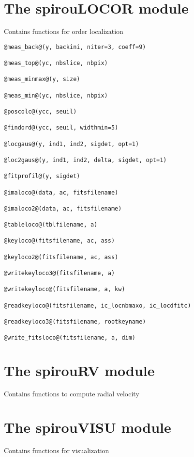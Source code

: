 \clearpage
\newpage
\section{The spirouLOCOR module}

Contains functions for order localization

\begin{lstlisting}[style=pythonstyle]
@meas_back@(y, backini, niter=3, coeff=9)

@meas_top@(yc, nbslice, nbpix)

@meas_minmax@(y, size)

@meas_min@(yc, nbslice, nbpix)

@poscolc@(ycc, seuil)

@findord@(ycc, seuil, widthmin=5)

@locgaus@(y, ind1, ind2, sigdet, opt=1)

@loc2gaus@(y, ind1, ind2, delta, sigdet, opt=1)

@fitprofil@(y, sigdet)

@imaloco@(data, ac, fitsfilename)

@imaloco2@(data, ac, fitsfilename)

@tableloco@(tblfilename, a)

@keyloco@(fitsfilename, ac, ass)

@keyloco2@(fitsfilename, ac, ass)

@writekeyloco3@(fitsfilename, a)

@writekeyloco@(fitsfilename, a, kw)

@readkeyloco@(fitsfilename, ic_locnbmaxo, ic_locdfitc)

@readkeyloco3@(fitsfilename, rootkeyname)

@write_fitsloco@(fitsfilename, a, dim)
\end{lstlisting}


\clearpage
\newpage
\section{The spirouRV module}

Contains functions to compute radial velocity

\clearpage
\newpage
\section{The spirouVISU module}

Contains functions for visualization
